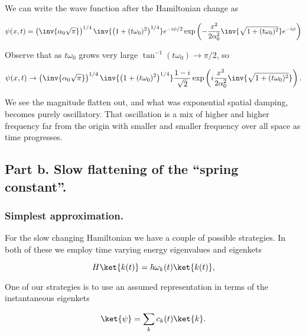 We can write the wave function after the Hamiltonian change as

\begin{equation}\label{eqn:qmTwoExamReflection:310b}
\psi(x, t) = 
\left( \inv{\alpha_0 \sqrt{\pi}} \right)^{1/4}
\inv{\left( 1 + (t \omega_0)^2 \right)^{1/4}}
e^{-i \phi/2}
\exp\left(
-\frac{x^2}{2 \alpha_0^2} \inv{\sqrt{1 + (t \omega_0)^2}} e^{-i \phi}
\right)
\end{equation}

Observe that as $t \omega_0$ grows very large $\tan^{-1}(t \omega_0) \rightarrow \pi/2$, so 

\begin{equation}\label{eqn:qmTwoExamReflection:310c}
\psi(x, t) \rightarrow
\left( \inv{\alpha_0 \sqrt{\pi}} \right)^{1/4}
\inv{\left( 1 + (t \omega_0)^2 \right)^{1/4}}
\frac{1 - i}{\sqrt{2}}
\exp\left(
i\frac{x^2}{2 \alpha_0^2} \inv{\sqrt{1 + (t \omega_0)^2}} 
\right).
\end{equation}

We see the magnitude flatten out, and what was exponential spatial damping, becomes purely oscillatory.  That oscillation is a mix of higher and higher frequency far from the origin with smaller and smaller frequency over all space as time progresses.

\subsection{Part b.  Slow flattening of the ``spring constant''.}

\subsubsection{Simplest approximation.}

For the slow changing Hamiltonian we have a couple of possible strategies.  In both of these we employ time varying energy eigenvalues and eigenkets

\begin{equation}\label{eqn:qmTwoExamReflection:390}
H \ket{k(t)} = \hbar \omega_k(t) \ket{k(t)},
\end{equation}

One of our strategies is to use an assumed representation in terms of the instantaneous eigenkets

\begin{equation}\label{eqn:qmTwoExamReflection:410}
\ket{\psi} = \sum_k c_k(t) \ket{k}.
\end{equation}

